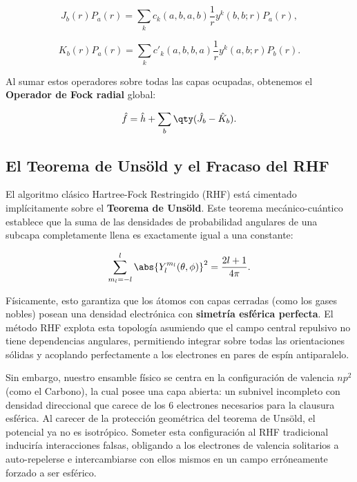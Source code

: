 \begin{equation}
  J_b(r) P_a(r) = \sum_k c_k(a,b,a,b) \frac{1}{r} y^k(b,b; r) P_a(r),
\end{equation}

\begin{equation}
  K_b(r) P_a(r) = \sum_k c'_k(a,b,b,a) \frac{1}{r} y^k(a,b; r) P_b(r).
\end{equation}

Al sumar estos operadores sobre todas las capas ocupadas, obtenemos el \textbf{Operador de Fock radial} global:

\begin{equation}
  \hat{f} = \hat{h} + \sum_b \qty( \hat{J}_b - \hat{K}_b ).
\end{equation}

\subsection{El Teorema de Unsöld y el Fracaso del RHF}

El algoritmo clásico Hartree-Fock Restringido (RHF) está cimentado implícitamente sobre el \textbf{Teorema de Unsöld}. Este teorema mecánico-cuántico establece que la suma de las densidades de probabilidad angulares de una subcapa completamente llena es exactamente igual a una constante:

\begin{equation}
  \sum_{m_l = -l}^{l} \abs{Y_l^{m_l}(\theta, \phi)}^2 = \frac{2l+1}{4\pi}.
\end{equation}

Físicamente, esto garantiza que los átomos con capas cerradas (como los gases nobles) posean una densidad electrónica con \textbf{simetría esférica perfecta}. El método RHF explota esta topología asumiendo que el campo central repulsivo no tiene dependencias angulares, permitiendo integrar sobre todas las orientaciones sólidas y acoplando perfectamente a los electrones en pares de espín antiparalelo.

Sin embargo, nuestro ensamble físico se centra en la configuración de valencia $np^2$ (como el Carbono), la cual posee una capa abierta: un subnivel incompleto con densidad direccional que carece de los $6$ electrones necesarios para la clausura esférica. Al carecer de la protección geométrica del teorema de Unsöld, el potencial ya no es isotrópico. Someter esta configuración al RHF tradicional induciría interacciones falsas, obligando a los electrones de valencia solitarios a auto-repelerse e intercambiarse con ellos mismos en un campo erróneamente forzado a ser esférico.


